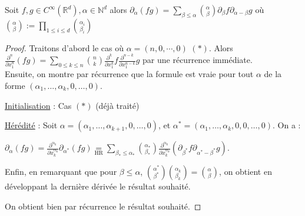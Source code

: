 \begin{lemme}
Soit $f,g\in C^\infty (\mathbb{R} ^d), \alpha \in \mathbb{N} ^d$  alors $\partial_\alpha (fg)=\sum\limits_{\beta\le \alpha } \binom{\alpha}{\beta} \partial_\beta f\partial_{\alpha -\beta}g$ où $\binom{\alpha}{\beta}:=\prod\limits_{1\le i\le d}^{} \binom{\alpha _i}{\beta_i}$
\end{lemme}
\begin{proof}
    Traitons d'abord le cas où $\alpha =(n,0,\cdots,0)$ $(*)$.
    Alors $\frac{\partial^n}{\partial x_1^n}(fg)=\sum\limits_{0\le k\le n}^{} \binom{n}{k} \frac{\partial^k}{\partial x_1^k}f\frac{\partial^{n-k}}{\partial x_1^{n-k}}g$ par une récurrence immédiate.\\

    Ensuite, on montre par récurrence que la formule est vraie pour tout $\alpha$ de la forme $(\alpha_1,\ldots,\alpha_k,0,\ldots,0)$.
    
    \underline{Initialisation} : Cas $(*)$ (déjà traité)

    \underline{Hérédité} : Soit $\alpha = (\alpha_1,\ldots,\alpha_{k+1},0,\ldots,0)$, et $\alpha^* = (\alpha_1,\ldots,\alpha_k,0,0,\ldots,0)$. On a :

    $\partial_{\alpha }(fg)=\frac{\partial^{\alpha _k}}{\partial x_k^{\alpha _k}} \partial_{\alpha^*} (fg)\underset{\text{HR}}{=}\sum\limits_{\beta_*\le \alpha _*} \binom{\alpha _*}{\beta_*} \frac{\partial^{\alpha_k}}{\partial x_k^{\alpha_k}}\left( \partial_{\beta^*} f \partial_{\alpha^*-\beta^*} g \right)$.

    
    Enfin, en remarquant que pour $\beta \leq \alpha$, $\binom{\alpha^*}{\beta^*}\binom{\alpha _k }{\beta_k}=\binom{\alpha}{\beta}$, on obtient en développant la dernière dérivée le résultat souhaité.

    On obtient bien par récurrence le résultat souhaité.
\end{proof}
